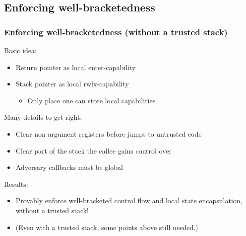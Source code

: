 \documentclass{beamer}
\newcommand{\plainperm}[1]{\mathrm{#1}}
\newcommand{\rwlx}{\plainperm{rwlx}}
\begin{document}
\subsection{Enforcing well-bracketedness}
\begin{frame}
  \frametitle{Enforcing well-bracketedness (without a trusted stack)}
  \pause
  Basic idea:
  \begin{itemize}
  \item Return pointer as local enter-capability
  \item Stack pointer as local $\rwlx$-capability
    \begin{itemize} 
    \item Only place one can store local capabilities
    \end{itemize}
  \end{itemize}
  \pause
  Many details to get right:
  \begin{itemize}
  \item Clear non-argument registers before jumps to untrusted code
  \item Clear part of the stack the callee gains control over
  \item Adversary callbacks must be global
  \end{itemize}
  \pause
  Results:
  \begin{itemize}
  \item Provably enforce well-bracketed control flow and local state
    encapsulation, without a trusted stack!
  \item (Even with a trusted stack, some points above still needed.)
  \end{itemize}
\end{frame}
\end{document}
